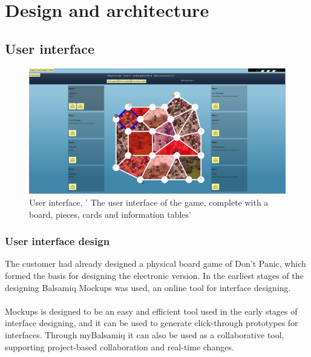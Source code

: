 \chapter{Design and architecture}

\section{User interface}

\begin{figure}[H]
  \centering
    \includegraphics[width=1.0\textwidth]{img/gamefinal.png}
  \caption{User interface, ' The user interface of the game, complete with a board, pieces, cards and information tables'} 
  \label{fig:finalgamegui}
\end{figure}









\subsection{User interface design}

The customer had already designed a physical board game of Don’t Panic, which formed the basis for designing the electronic version. In the earliest stages of the designing Balsamiq Mockups was used, an online tool for interface designing.\\
\\
Mockups is designed to be an easy and efficient tool used in the early stages of interface designing, and it can be used to generate click-through prototypes for interfaces. Through myBalsamiq it can also be used as a collaborative tool, supporting project-based collaboration and real-time changes.\\






